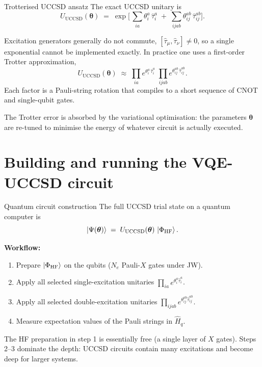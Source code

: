 \documentclass[10pt,aspectratio=169]{beamer}
\begin{document}
\begin{frame}{Trotterised UCCSD ansatz}
The exact UCCSD unitary is
\[
U_{\mathrm{UCCSD}}(\bm\theta)
\;=\;
\exp\!\Big[\,\sum_{ia}\theta_i^a\,\hat\tau_i^a \;+\; \sum_{ijab}\theta_{ij}^{ab}\,\hat\tau_{ij}^{ab}\Big].
\]

Excitation generators generally do not commute, $[\hat\tau_\mu,\hat\tau_\nu]\neq 0$,
so a single exponential cannot be implemented exactly. In practice one uses a first-order Trotter approximation,
\[
U_{\mathrm{UCCSD}}(\bm\theta)
\;\approx\;
\prod_{ia} e^{\theta_i^a\,\hat\tau_i^a}\;
\prod_{ijab} e^{\theta_{ij}^{ab}\,\hat\tau_{ij}^{ab}}.
\]
Each factor is a Pauli-string rotation that compiles to a short sequence of CNOT and single-qubit gates.

\bigskip
The Trotter error is absorbed by the variational optimisation:
the parameters $\bm\theta$ are re-tuned to minimise the energy of whatever circuit is actually executed.
\end{frame}

\section{Building and running the VQE-UCCSD circuit}

\begin{frame}{Quantum circuit construction}
The full UCCSD trial state on a quantum computer is
\[
\ket{\Psi(\bm\theta)}
\;=\;
U_{\mathrm{UCCSD}}(\bm\theta)\,\ket{\Phi_{\mathrm{HF}}}.
\]

\textbf{Workflow:}
\begin{enumerate}
  \item Prepare $\ket{\Phi_{\mathrm{HF}}}$ on the qubits ($N_e$ Pauli-$X$ gates under JW).
  \item Apply all selected single-excitation unitaries $\prod_{ia} e^{\theta_i^a\hat\tau_i^a}$.
  \item Apply all selected double-excitation unitaries $\prod_{ijab} e^{\theta_{ij}^{ab}\hat\tau_{ij}^{ab}}$.
  \item Measure expectation values of the Pauli strings in $\hat H_q$.
\end{enumerate}

\medskip
The HF preparation in step 1 is essentially free (a single layer of $X$ gates).
Steps 2--3 dominate the depth: UCCSD circuits contain many excitations and become deep for larger systems.
\end{frame}
\end{document}
